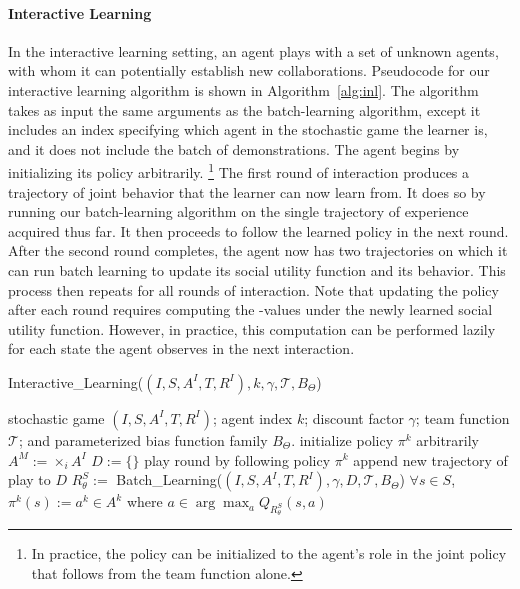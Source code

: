 
\vspace{\up}
\paragraph{Interactive Learning}
\label{sec:interactive}

In the interactive learning setting, an agent plays with a set of
unknown agents, with whom it can potentially establish new
collaborations.  Pseudocode for our interactive learning algorithm is
shown in Algorithm~\ref{alg:inl}. The algorithm takes as input the
same arguments as the batch-learning algorithm, except it includes an
index specifying which agent in the stochastic game the learner is,
and it does not include the batch of demonstrations. The agent begins
by initializing its policy arbitrarily.%
\footnote{In practice, the policy can be initialized to the agent's role
in the joint policy that follows from the team function alone.}
%
The first round of interaction produces a trajectory of joint behavior
that the learner can now learn from.  It does so by running our
batch-learning algorithm on the single trajectory of experience
acquired thus far.  It then proceeds to follow the learned policy in
the next round.  After the second round completes, the agent now has
two trajectories on which it can run batch learning to update its
social utility function and its behavior.  This process then repeats
for all rounds of interaction.
%
Note that updating the policy after each round requires computing the
\Q-values under the newly learned social utility function.  However,
in practice, this computation can be performed lazily for each state
the agent observes in the next interaction.

\begin{algorithm}[t]
\caption{Interactive\_Learning($(I,S,A^I,T,R^I), k, \gamma, {\mathcal T}, B_\Theta$)}
\label{alg:inl}
\begin{algorithmic}
\Require stochastic game $(I,S,A^I,T,R^I)$; agent index $k$; discount factor $\gamma$; team function ${\mathcal T}$; and parameterized bias function family $B_\Theta$.
\State initialize policy $\pi^k$ arbitrarily
\State $A^M := \times_i A^I$ 
\State $D := \{\}$
\State play round by following policy $\pi^k$ %
\State append new trajectory of play to $D$
\State $R^S_\theta :=$ Batch\_Learning($(I,S,A^I,T,R^I), \gamma, D, {\mathcal T}, B_\Theta$)
\State $\forall s \in S$, $\pi^k(s) := a^k \in A^k$ where $a \in \arg \max_a Q_{R^S_\theta}(s, a)$
\EndFor 
\end{algorithmic}
\end{algorithm}
